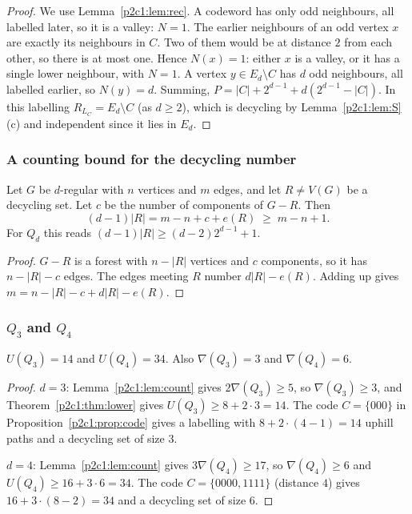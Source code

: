 \begin{proof}
We use Lemma~\ref{p2c1:lem:rec}. A codeword has only odd neighbours, all labelled later, so it is
a valley: $N=1$. The earlier neighbours of an odd vertex $x$ are exactly its neighbours in $C$. Two
of them would be at distance $2$ from each other, so there is at most one. Hence $N(x)=1$: either
$x$ is a valley, or it has a single lower neighbour, with $N=1$. A vertex $y\in E_d\setminus C$ has
$d$ odd neighbours, all labelled earlier, so $N(y)=d$. Summing,
$P=|C|+2^{d-1}+d(2^{d-1}-|C|)$. In this labelling $R_{L_C}=E_d\setminus C$ (as $d\ge2$), which is
decycling by Lemma~\ref{p2c1:lem:S}(c) and independent since it lies in $E_d$.
\end{proof}

\subsubsection{A counting bound for the decycling number}\label{p2c1:sec:nabla}

\begin{lemma}\label{p2c1:lem:count}
Let $G$ be $d$-regular with $n$ vertices and $m$ edges, and let $R\ne V(G)$ be a decycling set.
Let $c$ be the number of components of $G-R$. Then
\[
  (d-1)|R|=m-n+c+e(R)\;\ge\;m-n+1.
\]
For $Q_d$ this reads $(d-1)|R|\ge(d-2)2^{d-1}+1$.
\end{lemma}

\begin{proof}
$G-R$ is a forest with $n-|R|$ vertices and $c$ components, so it has $n-|R|-c$ edges. The edges
meeting $R$ number $d|R|-e(R)$. Adding up gives $m=n-|R|-c+d|R|-e(R)$.
\end{proof}

\subsubsection{$Q_3$ and $Q_4$}\label{p2c1:sec:main}

\begin{theorem}\label{p2c1:thm:main}
$U(Q_3)=14$ and $U(Q_4)=34$. Also $\nabla(Q_3)=3$ and $\nabla(Q_4)=6$.
\end{theorem}

\begin{proof}
$d=3$: Lemma~\ref{p2c1:lem:count} gives $2\nabla(Q_3)\ge5$, so $\nabla(Q_3)\ge3$, and
Theorem~\ref{p2c1:thm:lower} gives $U(Q_3)\ge8+2\cdot3=14$. The code $C=\{000\}$ in
Proposition~\ref{p2c1:prop:code} gives a labelling with $8+2\cdot(4-1)=14$ uphill paths and a
decycling set of size $3$.

$d=4$: Lemma~\ref{p2c1:lem:count} gives $3\nabla(Q_4)\ge17$, so $\nabla(Q_4)\ge6$ and
$U(Q_4)\ge16+3\cdot6=34$. The code $C=\{0000,1111\}$ (distance $4$) gives
$16+3\cdot(8-2)=34$ and a decycling set of size $6$.
\end{proof}

